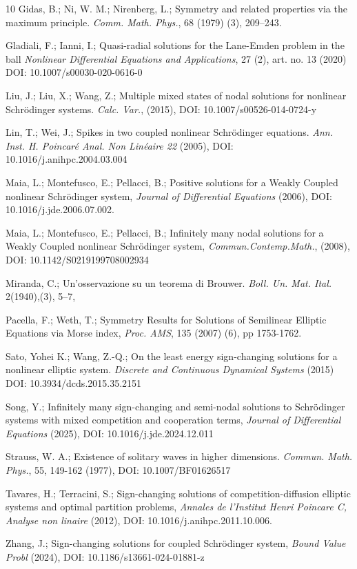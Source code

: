 \documentclass[reqno]{amsart}
\begin{document}
\begin{thebibliography}{10}
Gidas, B.; Ni, W. M.; Nirenberg, L.;
Symmetry and related properties via the maximum
principle. \emph{Comm. Math. Phys.}, 68 (1979) (3), 209--243.

Gladiali, F.; Ianni, I.;
Quasi-radial solutions for the Lane-Emden problem in the ball
\emph{Nonlinear Differential Equations and Applications}, 27 (2), art. no. 13 (2020)
DOI: 10.1007/s00030-020-0616-0

Liu, J.; Liu, X.; Wang, Z.;
Multiple mixed states of nodal solutions for nonlinear Schr\"{o}dinger systems.
\emph{Calc. Var.}, (2015), DOI: 10.1007/s00526-014-0724-y

Lin, T.; Wei, J.;
Spikes in two coupled nonlinear Schr\"{o}dinger equations.
\emph{Ann. Inst. H.   Poincar\'e Anal. Non Lin\'eaire 22} (2005),
  DOI: 10.1016/j.anihpc.2004.03.004

Maia, L.; Montefusco, E.; Pellacci, B.;
Positive solutions for a Weakly Coupled nonlinear Schr\"odinger system,
\emph{Journal of Differential Equations} (2006),
DOI: 10.1016/j.jde.2006.07.002.

Maia, L.; Montefusco, E.; Pellacci, B.;
Infinitely many nodal solutions for a Weakly Coupled nonlinear Schr\"odinger system,
\emph{Commun.Contemp.Math.}, (2008),  DOI: 10.1142/S0219199708002934

 Miranda, C.;
Un'osservazione su un teorema di Brouwer.
\emph{Boll. Un. Mat. Ital.} 2(1940),(3), 5--7,

Pacella, F.;  Weth, T.;
Symmetry Results for Solutions of Semilinear Elliptic
Equations via Morse index, \emph{Proc. AMS}, 135 (2007) (6), pp 1753-1762.

Sato, Yohei K.;   Wang, Z.-Q.;
On the least energy sign-changing solutions for a nonlinear elliptic system.
\emph{Discrete and Continuous Dynamical Systems} (2015)
DOI: 10.3934/dcds.2015.35.2151

Song, Y.;
Infinitely many sign-changing and semi-nodal solutions to Schr\"{o}dinger systems
with mixed competition and cooperation terms,
\emph{Journal of Differential Equations} (2025), DOI: 10.1016/j.jde.2024.12.011

Strauss, W. A.;
Existence of solitary waves in higher dimensions.
\emph{Commun. Math. Phys.}, 55, 149-162 (1977), DOI: 10.1007/BF01626517

Tavares, H.; Terracini, S.;
Sign-changing solutions of competition-diffusion elliptic systems and optimal
partition problems,
\emph{Annales de l'Institut Henri Poincare C, Analyse non linaire} (2012),
 DOI: 10.1016/j.anihpc.2011.10.006.

Zhang, J.;
Sign-changing solutions for coupled Schr\"odinger system,
\emph{Bound Value Probl} (2024), DOI: 10.1186/s13661-024-01881-z

\end{thebibliography}
\end{document}
